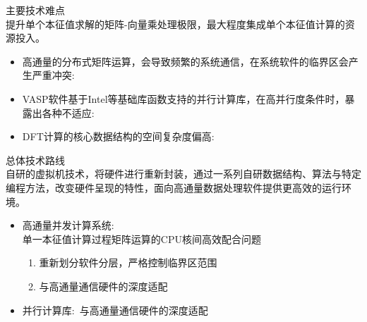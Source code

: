 \documentclass[a0paper,portrait,fontscale=0.35]{baposter}
\newcommand{\hei}{\CJKfamily{hei}}                          %
\begin{document}
\begin{poster}
{	\vspace{0.5em}
	{\hei 主要技术难点}\\[0.3em]
	提升单个本征值求解的矩阵-向量乘处理极限，最大程度集成单个本征值计算的资源投入。
	\begin{itemize}
			\item 高通量的分布式矩阵运算，会导致频繁的系统通信，在系统软件的临界区会产生严重冲突:~
				{\fontsize{9.2pt}{7.2pt}\selectfont{例如，多个计算节点同时请求访问共享资源、传输关键数据时，频繁的竞争与等待使得数据传输延迟大幅增加。}}
		\item \textrm{VASP}软件基于\textrm{Intel}等基础库函数支持的并行计算库，在高并行度条件时，暴露出各种不适应:~
			{\fontsize{9.2pt}{7.2pt}\selectfont{例如，某些矩阵运算算法在多核心并行计算时，数据划分与同步机制不合理，导致核心间负载不均衡，大量核心处于空闲等待状态；部分通信算法在高并发数据传输时，因协议设计缺陷引发数据拥塞。}}
		\item \textrm{DFT}计算的核心数据结构的空间复杂度偏高:~
			{\fontsize{9.2pt}{7.2pt}}
	\end{itemize}
	{\hei 总体技术路线}\\[0.3em]
	自研的虚拟机技术，将硬件进行重新封装，通过一系列自研数据结构、算法与特定编程方法，改变硬件呈现的特性，面向高通量数据处理软件提供更高效的运行环境。
	\begin{itemize}
		\item 高通量并发计算系统:\\
			单一本征值计算过程矩阵运算的\textrm{CPU}核间高效配合问题
			\begin{enumerate}
\fontsize{9.2pt}{7.2pt}\selectfont
				\item 重新划分软件分层，严格控制临界区范围
				\item 与高通量通信硬件的深度适配
			\end{enumerate}
		\item 并行计算库:~与高通量通信硬件的深度适配
			\begin{itemize}
\fontsize{9.2pt}{7.2pt}\selectfont

\end{itemize}
\end{itemize}}
\end{poster}
\end{document}
